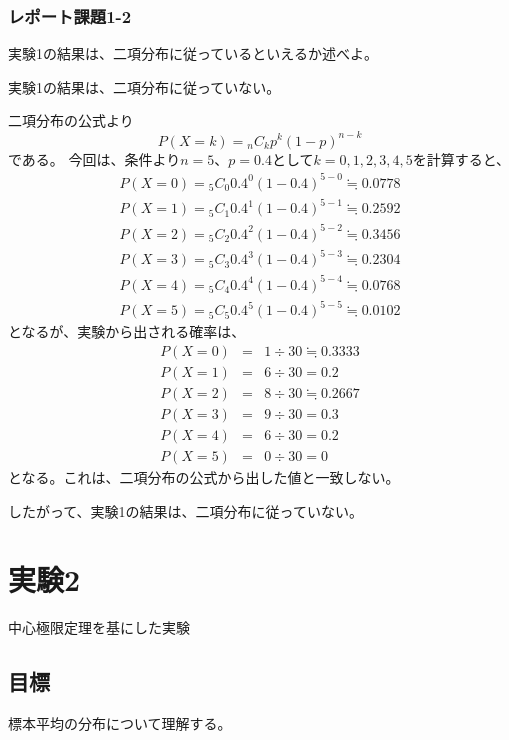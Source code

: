 \documentclass[12pt]{jarticle}
\begin{document}
\subsubsection*{レポート課題1-2}
\begin{shadebox}
    実験1の結果は、二項分布に従っているといえるか述べよ。
\end{shadebox}
実験1の結果は、二項分布に従っていない。

二項分布の公式より
\begin{equation}
    P(X=k)= {}_n C_k p^k{(1-p)}^{n-k} \nonumber
\end{equation}
である。
今回は、条件より$n=5$、$p=0.4$として$k=0,1,2,3,4,5$を計算すると、
\begin{eqnarray}
    P(X=0)= {}_5 C_0 0.4^0{(1-0.4)}^{5-0} \fallingdotseq  0.0778 \nonumber \\
    P(X=1)= {}_5 C_1 0.4^1{(1-0.4)}^{5-1} \fallingdotseq  0.2592 \nonumber \\
    P(X=2)= {}_5 C_2 0.4^2{(1-0.4)}^{5-2} \fallingdotseq 0.3456\nonumber \\
    P(X=3)= {}_5 C_3 0.4^3{(1-0.4)}^{5-3} \fallingdotseq 0.2304 \nonumber \\
    P(X=4)= {}_5 C_4 0.4^4{(1-0.4)}^{5-4} \fallingdotseq 0.0768 \nonumber \\
    P(X=5)= {}_5 C_5 0.4^5{(1-0.4)}^{5-5} \fallingdotseq 0.0102\nonumber
\end{eqnarray}
となるが、実験から出される確率は、
\begin{eqnarray}
    P(X=0) &=& 1÷30 \fallingdotseq 0.3333 \nonumber \\
    P(X=1)&=& 6÷30 = 0.2 \nonumber \\
    P(X=2)&=& 8÷30 \fallingdotseq 0.2667\nonumber \\
    P(X=3)&=& 9÷30 = 0.3 \nonumber \\
    P(X=4)&=& 6÷30 = 0.2 \nonumber \\
    P(X=5)&=& 0÷30 = 0 \nonumber
\end{eqnarray}
となる。これは、二項分布の公式から出した値と一致しない。

したがって、実験1の結果は、二項分布に従っていない。

\clearpage
\section{実験2}
中心極限定理を基にした実験

\subsection{目標}
標本平均の分布について理解する。
\end{document}
